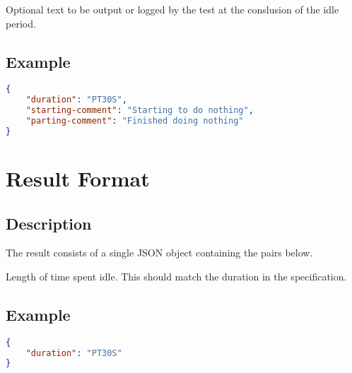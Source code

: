 \documentclass[10pt]{article}
\begin{document}
 Optional text to be output or
logged by the test at the conslusion of the idle period.

\subsection{Example}
\begin{lstlisting}[language=json]
{
    "duration": "PT30S",
    "starting-comment": "Starting to do nothing",
    "parting-comment": "Finished doing nothing"
}
\end{lstlisting}


%
%

\section{Result Format}

\subsection{Description}
The result consists of a single JSON object containing the pairs
below.  \seejson

 Length of time spent idle.  This should
match the duration in the specification.


\subsection{Example}
\begin{lstlisting}[language=json]
{
    "duration": "PT30S"
}
\end{lstlisting}
\end{document}
